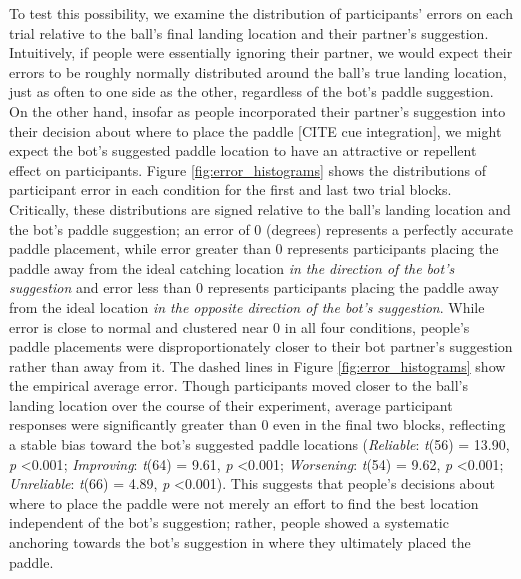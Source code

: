\documentclass[10pt,letterpaper]{article}
\begin{document}
To test this possibility, we examine the distribution of participants' errors on each trial relative to the ball's final landing location and their partner's suggestion. Intuitively, if people were essentially ignoring their partner, we would expect their errors to be roughly normally distributed around the ball's true landing location, just as often to one side as the other, regardless of the bot's paddle suggestion. On the other hand, insofar as people incorporated their partner's suggestion into their decision about where to place the paddle [CITE cue integration], we might expect the bot's suggested paddle location to have an attractive or repellent effect on participants. Figure \ref{fig:error_histograms} shows the distributions of participant error in each condition for the first and last two trial blocks. Critically, these distributions are signed relative to the ball's landing location and the bot's paddle suggestion; an error of 0 (degrees) represents a perfectly accurate paddle placement, while error greater than 0 represents participants placing the paddle away from the ideal catching location \textit{in the direction of the bot's suggestion} and error less than 0 represents participants placing the paddle away from the ideal location \textit{in the opposite direction of the bot's suggestion}. While error is close to normal and clustered near 0 in all four conditions, people's paddle placements were disproportionately closer to their bot partner's suggestion rather than away from it. The dashed lines in Figure \ref{fig:error_histograms} show the empirical average error. Though participants moved closer to the ball's landing location over the course of their experiment, average participant responses were significantly greater than 0 even in the final two blocks, reflecting a stable bias toward the bot's suggested paddle locations (\textit{Reliable}: \textit{t}(56) = 13.90, \textit{p} \textless{0.001}; \textit{Improving}: \textit{t}(64) = 9.61, \textit{p} \textless{0.001}; \textit{Worsening}: \textit{t}(54) = 9.62, \textit{p} \textless{0.001}; \textit{Unreliable}: \textit{t}(66) = 4.89, \textit{p} \textless{0.001}). This suggests that people's decisions about where to place the paddle were not merely an effort to find the best location independent of the bot's suggestion; rather, people showed a systematic anchoring towards the bot's suggestion in where they ultimately placed the paddle.  
\end{document}
